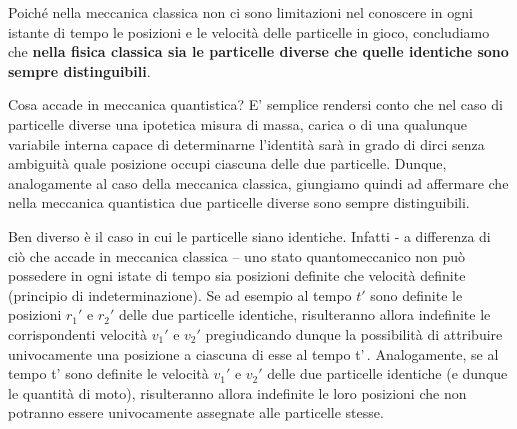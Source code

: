 Poiché nella meccanica classica non ci sono limitazioni nel conoscere in
ogni istante di tempo le posizioni e le velocità delle particelle in
gioco, concludiamo che \textbf{nella fisica classica sia le particelle
diverse che quelle identiche sono sempre distinguibili}.

Cosa accade in meccanica quantistica?
E' semplice rendersi conto che nel
caso di particelle diverse una ipotetica misura di massa, carica o di
una qualunque variabile interna capace di determinarne l'identità sarà
in grado di dirci senza ambiguità quale posizione occupi ciascuna delle
due particelle.
Dunque, analogamente al caso della meccanica classica,
giungiamo quindi ad affermare che nella meccanica quantistica due
particelle diverse sono sempre distinguibili.

Ben diverso è il caso in cui le particelle siano identiche.
Infatti - a
differenza di ciò che accade in meccanica classica -- uno stato
quantomeccanico non può possedere in ogni istate di tempo sia posizioni
definite che velocità definite (principio di indeterminazione).
Se ad
esempio al tempo \(t'\) sono definite le posizioni \(r_{1}'\) e
\(r_{2}'\) delle due particelle identiche, risulteranno allora
indefinite le corrispondenti velocità \(v_{1}'\) e \(v_{2}'\)
pregiudicando dunque la possibilità di attribuire univocamente una
posizione a ciascuna di esse al tempo t'\,. Analogamente, se al tempo
t' sono definite le velocità \(v_{1}'\) e \(v_{2}'\) delle due
particelle identiche (e dunque le quantità di moto), risulteranno allora
indefinite le loro posizioni che non potranno essere univocamente
assegnate alle particelle stesse.

